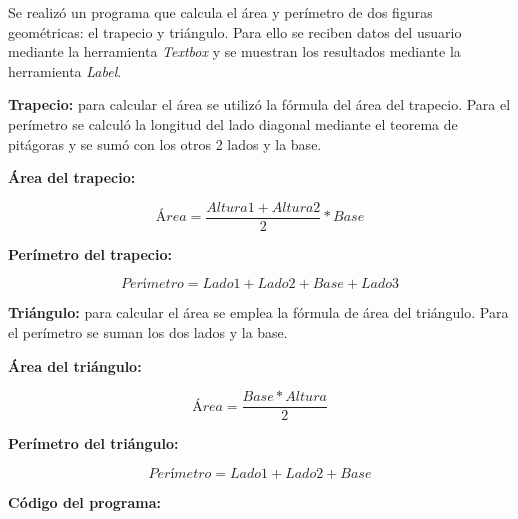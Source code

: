 Se realizó un programa que calcula el área y perímetro de dos figuras geométricas: el trapecio y triángulo. Para ello se reciben datos del usuario mediante la herramienta \emph{Textbox} y se muestran los resultados mediante la herramienta \emph{Label}.

\textbf{Trapecio:} para calcular el área se utilizó la fórmula del área del trapecio. Para el perímetro se calculó la longitud del lado diagonal mediante el teorema de pitágoras y se sumó con los otros 2 lados y la base.

\textbf{Área del trapecio:}

\begin{equation*}
  Área = \frac{Altura 1 + Altura 2}{2} * Base
\end{equation*}

\textbf{Perímetro del trapecio:}

\begin{equation*}
  Perímetro = Lado1 + Lado2 + Base + Lado3
\end{equation*}

\textbf{Triángulo:} para calcular el área se emplea la fórmula de área del triángulo. Para el perímetro se suman los dos lados y la base.

\textbf{Área del triángulo:}

\begin{equation*}
  Área = \frac{Base * Altura}{2}
\end{equation*}

\textbf{Perímetro del triángulo:}

\begin{equation*}
  Perímetro = Lado1 + Lado2 + Base
\end{equation*}

\newpage
\textbf{Código del programa:}

